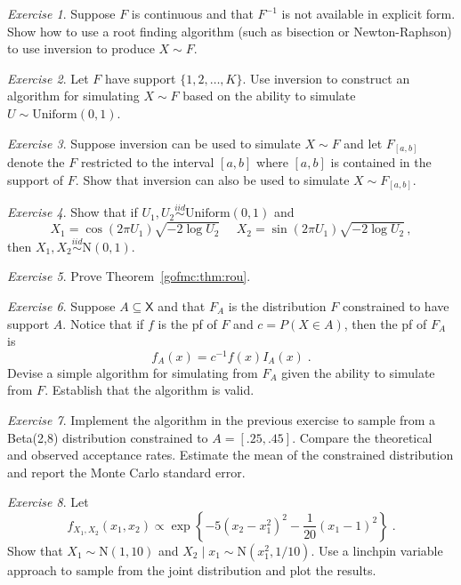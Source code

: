 \documentclass[12pt]{article}
\theoremstyle{plain}
\theoremstyle{definition}
\theoremstyle{remark}
\newtheorem{hw}{Exercise}[section]
\newcommand{\sX}{\mathsf{X}}
\begin{document}
\begin{hw}
Suppose $F$ is continuous and that  $F^{-1}$ is not available in
explicit form. Show how to use a root finding algorithm (such as
bisection or Newton-Raphson) to use inversion to produce $X \sim F$. 
\end{hw}

\begin{hw}
Let $F$ have support $\{1,2,\ldots,K\}$.  Use inversion to construct
an algorithm for simulating $X \sim F$ based on the ability to
simulate $U \sim \text{Uniform}(0,1)$. 
\end{hw}

\begin{hw}
  Suppose inversion can be used to simulate $X \sim F$ and let
  $F_{[a,b]}$ denote the $F$ restricted to the interval $[a,b]$ where
  $[a,b]$ is contained in the support of $F$.  Show that inversion can
  also be used to simulate $X \sim F_{[a,b]}$.
\end{hw}

\begin{hw}
Show that if $U_1 , U_2 \stackrel{iid}{\sim}
  \text{Uniform}(0,1)$ and
\[
X_1 = \cos(2\pi U_1) \sqrt{-2 \log U_2} ~~~~~~ X_2 = \sin(2\pi U_1)
\sqrt{-2 \log U_2}\, ,
\]
then $X_1, X_2 \stackrel{iid}{\sim}\text{N}(0,1)$.
\end{hw}

\begin{hw}
Prove Theorem~\ref{gofmc:thm:rou}.
\end{hw}

\begin{hw}
Suppose $A \subseteq \sX$ and that $F_{A}$ is the distribution $F$
constrained to have support $A$.  Notice that if $f$ is the pf of $F$
and $c= P(X \in A)$, then the pf of $F_{A}$ is
\[
f_{A}(x) = c^{-1} f(x) I_{A}(x) \; .
\]
Devise a simple algorithm for simulating from $F_A$ given the ability
to simulate from $F$.  Establish that the algorithm is valid.  
\end{hw}

\begin{hw}
Implement the algorithm in the previous exercise to sample from a
Beta(2,8) distribution constrained to $A=[.25,.45]$.  Compare the
theoretical and observed acceptance rates. Estimate the mean of the
constrained distribution and report the Monte Carlo standard error. 
\end{hw}

\begin{hw}
Let
$$
f_{X_1, X_2}(x_1, x_2) \propto \exp \left\{ -5(x_2 - x_{1}^{2})^{2} -
  \frac{1}{20} (x_1 - 1)^{2} \right\} \; . 
$$
Show that $X_1 \sim \text{N}(1,10)$ and $X_{2}\mid x_1 \sim
\text{N}(x_{1}^2, 1/10)$. Use a linchpin variable approach to sample
from the joint distribution and plot the results.   
\end{hw}
\end{document}
